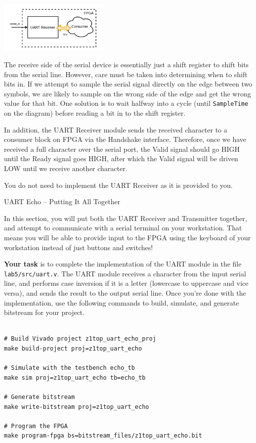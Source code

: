 \documentclass[11pt]{article}
\makeatletter
\renewcommand{\subsection}
{\@startsection {subsection}{1}{0pt}
 {-1ex}
 {0.5ex}
 {\bfseries\normalsize}}
\makeatother
\begin{document}
\begin{center}
\includegraphics[width=0.4\textwidth]{figs/uart_rx.png}
\end{center}

The receive side of the serial device is essentially just a shift register to shift bits from the serial line.
However, care must be taken into determining when to shift bits in.
If we attempt to sample the serial signal directly on the edge between two symbols, we are likely to sample on the wrong side of the edge and get the wrong value for that bit.
One solution is to wait halfway into a cycle (until \verb|SampleTime| on the diagram) before reading a bit in to the shift register.

In addition, the UART Receiver module sends the received character to a consumer block on FPGA via the Handshake interface. Therefore, once we have received a full character over the serial port, the Valid signal should go HIGH until the Ready signal goes HIGH, after which the Valid signal will be driven LOW until we receive another character.

You do not need to implement the UART Receiver as it is provided to you.

\subsection{UART Echo -- Putting It All Together}

In this section, you will put both the UART Receiver and Transmitter together, and attempt to communicate with a serial terminal on your workstation. That means you will be able to provide input to the FPGA using the keyboard of your workstation instead of just buttons and switches!

\textbf{Your task} is to complete the implementation of the UART module in the file \verb|lab5/src/uart.v|. The UART module receives a character from the input serial line, and performs case inversion if it is a letter (lowercase to uppercase and vice versa), and sends the result to the output serial line. Once you're done with the implementation, use the following commands to build, simulate, and generate bitstream for your project.

\begin{verbatim}

# Build Vivado project z1top_uart_echo_proj
make build-project proj=z1top_uart_echo

# Simulate with the testbench echo_tb
make sim proj=z1top_uart_echo tb=echo_tb

# Generate bitstream
make write-bitstream proj=z1top_uart_echo

# Program the FPGA
make program-fpga bs=bitstream_files/z1top_uart_echo.bit
\end{verbatim}
\end{document}
